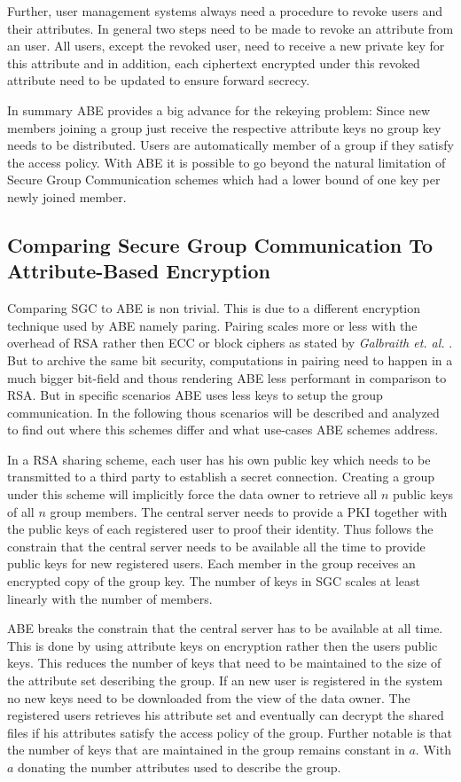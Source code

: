 Further, user management systems always need a procedure to revoke users and their attributes. 
In general two steps need to be made to revoke an attribute from an user. All users, except the revoked user, need to receive a new private key for this attribute and in addition, each ciphertext encrypted under this revoked attribute need to be updated to ensure forward secrecy. 

In summary ABE provides a big advance for the rekeying problem: Since new members joining a group just receive the respective attribute keys no group key needs to be distributed. Users are automatically member of a group if they satisfy the access policy. With \ac{ABE} it is possible to go beyond the natural limitation of Secure Group Communication schemes which had a lower bound of one key per newly joined member.  

\subsection{Comparing Secure Group Communication To Attribute-Based Encryption}
Comparing \ac{SGC} to \ac{ABE} is non trivial. This is due to a different encryption technique used by \ac{ABE} namely paring. Pairing scales more or less with the overhead of \ac{RSA} rather then \ac{ECC} or block ciphers as stated by \textit{Galbraith et. al.} \cite{galbraith2008pairings}. But to archive the same bit security, computations in pairing need to happen in a much bigger bit-field and thous rendering \ac{ABE} less performant in comparison to \ac{RSA}. But in specific scenarios \ac{ABE} uses less keys to setup the group communication. In the following thous scenarios will be described and analyzed to find out where this schemes differ and what use-cases \ac{ABE} schemes address.

In a \ac{RSA} sharing scheme, each user has his own public key which needs to be transmitted to a third party to establish a secret connection. Creating a group under this scheme will implicitly force the data owner to retrieve all $n$ public keys of all $n$ group members. The central server needs to provide a \ac{PKI} together with the public keys of each registered user to proof their identity. Thus follows the constrain that the central server needs to be available all the time to provide public keys for new registered users. Each member in the group receives an encrypted copy of the group key. The number of keys in \ac{SGC} scales at least linearly with the number of members. 

\ac{ABE} breaks the constrain that the central server has to be available at all time. This is done by using attribute keys on encryption rather then the users public keys. This reduces the number of keys that need to be maintained to the size of the attribute set describing the group. If an new user is registered in the system no new keys need to be downloaded from the view of the data owner. The registered users retrieves his attribute set and eventually can decrypt the shared files if his attributes satisfy the access policy of the group. Further notable is that the number of keys that are maintained in the group remains constant in $a$. With $a$ donating the number attributes used to describe the group. 

